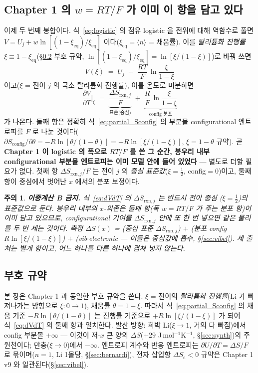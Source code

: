 \documentclass[11pt,a4paper]{article}
\newtheorem*{warnbox}{주의}
\newcommand{\rxn}{\mathrm{rxn}}
\newcommand{\eq}{\mathrm{eq}}
\newcommand{\config}{\mathrm{config}}
\newcommand{\avg}[1]{\langle #1\rangle}
\begin{document}
\subsection{Chapter 1 의 $w=RT/F$ 가 이미 이 항을 담고 있다}\label{sub:w_carries}
이제 두 번째 봉합이다. 식~\eqref{eq:logistic} 의 점유 logistic 을 전위에 대해 역함수로 풀면
$V=U_j+w\ln[(1-\xi_\eq)/\xi_\eq]$ 이다($\xi_\eq=\avg{n}$ = 채움률). 이를 \emph{탈리튬화 진행률}
$\xi\equiv1-\xi_\eq$(\S\ref{sub:sign} 부호 규약, $\ln[(1-\xi_\eq)/\xi_\eq]=\ln[\xi/(1-\xi)]$)로 바꿔 쓰면
\begin{equation}
V(\xi)\;=\;U_j\;+\;\frac{RT}{F}\,\ln\frac{\xi}{1-\xi}
\label{eq:Vxi}
\end{equation}
이고($\xi$ = 전이 $j$ 의 국소 탈리튬화 진행률), 이를 온도로 미분하면
\begin{equation}
\boxed{\;\frac{\partial V}{\partial T}\Big|_\xi
   \;=\;\underbrace{\frac{\Delta S_{\rxn,j}}{F}}_{\text{표준(중심)}}
   \;+\;\underbrace{\frac{R}{F}\,\ln\frac{\xi}{1-\xi}}_{\text{config 분포}}\;}
\label{eq:dVdT}
\end{equation}
가 나온다. 둘째 항은 정확히 식~\eqref{eq:partial_Sconfig} 의 부분몰 configurational 엔트로피를 $F$ 로
나눈 것이다($\partial S_\config/\partial\theta = -R\ln[\theta/(1-\theta)] = +R\ln[\xi/(1-\xi)]$,
$\xi=1-\theta$ 규약). 곧 \textbf{Chapter 1 이 logistic 의 폭으로 $RT/F$ 를 쓴 그 순간, 봉우리 내부
configurational 부분몰 엔트로피는 이미 모델 안에 들어 있었다} — 별도로 더할 필요가 없다. 첫째 항
$\Delta S_{\rxn,j}/F$ 는 전이 $j$ 의 \emph{중심 표준값}($\xi=\tfrac12$, config$=0$)이고, 둘째 항이
중심에서 벗어난 $x$ 에서의 분포 보정이다.

\begin{warnbox}
\textbf{이중계산 B 금지.} 식~\eqref{eq:dVdT} 의 $\Delta S_{\rxn,j}$ 는 반드시 \emph{전이 중심
($\xi=\tfrac12$)의 표준값}으로 둔다. 봉우리 내부의 $x$-의존은 둘째 항(폭 $w=RT/F$ 가 주는 분포 항)이
\emph{이미} 담고 있으므로, configurational 기여를 $\Delta S_{\rxn,j}$ 안에 또 한 번 넣으면 같은 물리를
두 번 세는 것이다. 측정 $\Delta S(x)$ = (중심 표준 $\Delta S_{\rxn,j}$) $+$ (분포 config $R\ln[\xi/(1-\xi)]$)
$+$ (vib$\cdot$electronic — 이들은 중심값에 흡수, \S\ref{sec:vibel}). 세 출처는 \emph{별개 항}이고,
어느 하나를 다른 하나에 겹쳐 넣지 않는다.
\end{warnbox}

\subsection{부호 규약}\label{sub:sign}
본 장은 Chapter 1 과 동일한 부호 규약을 쓴다. $\xi$ = 전이의 \emph{탈리튬화 진행률}(Li 가 빠져나가는
방향으로 $\xi:0\to1$), 채움률 $\theta=1-\xi$. 따라서 식~\eqref{eq:partial_Sconfig} 의 채움 기준
$-R\ln[\theta/(1-\theta)]$ 는 진행률 기준으로 $+R\ln[\xi/(1-\xi)]$ 가 되어 식~\eqref{eq:dVdT} 의
둘째 항과 일치한다. 발산 방향: 희박 Li($\xi\to1$, 거의 다 빠짐)에서 config 부분몰 $+\infty$ —
이것이 저-$x$ 큰 양의 $\Delta S$($+29$ J\,mol$^{-1}$K$^{-1}$, \S\ref{sec:synth})의 주원천이다;
만충($\xi\to0$)에서 $-\infty$. 엔트로피 계수와 반응 엔트로피는 $\partial U/\partial T=\Delta S/F$ 로
묶이며($n=1$, Li 1몰당, \S\ref{sec:bernardi}), 전자 삽입항 $\Delta S_e<0$ 규약은 Chapter 1 v9 와
일관된다(\S\ref{sec:vibel}).
\end{document}
